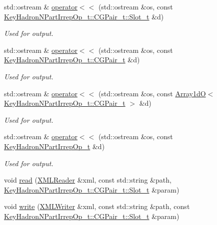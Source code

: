 \begin{DoxyCompactItemize}
std\+::ostream \& \mbox{\hyperlink{namespaceHadron_a61a4a4487102a9f9ee4c9409df53d3ed}{operator$<$$<$}} (std\+::ostream \&os, const \mbox{\hyperlink{structHadron_1_1KeyHadronNPartIrrepOp__t_1_1CGPair__t_1_1Slot__t}{Key\+Hadron\+N\+Part\+Irrep\+Op\+\_\+t\+::\+C\+G\+Pair\+\_\+t\+::\+Slot\+\_\+t}} \&d)
\begin{DoxyCompactList}\small\item\em Used for output. \end{DoxyCompactList}\item 
std\+::ostream \& \mbox{\hyperlink{namespaceHadron_a84411155d0fadad0466230e8cdd0d17c}{operator$<$$<$}} (std\+::ostream \&os, const \mbox{\hyperlink{structHadron_1_1KeyHadronNPartIrrepOp__t_1_1CGPair__t}{Key\+Hadron\+N\+Part\+Irrep\+Op\+\_\+t\+::\+C\+G\+Pair\+\_\+t}} \&d)
\begin{DoxyCompactList}\small\item\em Used for output. \end{DoxyCompactList}\item 
std\+::ostream \& \mbox{\hyperlink{namespaceHadron_a43b2528d47caea41d1eca554b9106b9c}{operator$<$$<$}} (std\+::ostream \&os, const \mbox{\hyperlink{classADAT_1_1Array1dO}{Array1dO}}$<$ \mbox{\hyperlink{structHadron_1_1KeyHadronNPartIrrepOp__t_1_1CGPair__t}{Key\+Hadron\+N\+Part\+Irrep\+Op\+\_\+t\+::\+C\+G\+Pair\+\_\+t}} $>$ \&d)
\begin{DoxyCompactList}\small\item\em Used for output. \end{DoxyCompactList}\item 
std\+::ostream \& \mbox{\hyperlink{namespaceHadron_a6d4dd7ed7a6efa27888f4ea9bdd20e51}{operator$<$$<$}} (std\+::ostream \&os, const \mbox{\hyperlink{structHadron_1_1KeyHadronNPartIrrepOp__t}{Key\+Hadron\+N\+Part\+Irrep\+Op\+\_\+t}} \&d)
\begin{DoxyCompactList}\small\item\em Used for output. \end{DoxyCompactList}\item 
void \mbox{\hyperlink{namespaceHadron_ab955c28b5566e0df089a26a611d4bf03}{read}} (\mbox{\hyperlink{classADATXML_1_1XMLReader}{X\+M\+L\+Reader}} \&xml, const std\+::string \&path, \mbox{\hyperlink{structHadron_1_1KeyHadronNPartIrrepOp__t_1_1CGPair__t_1_1Slot__t}{Key\+Hadron\+N\+Part\+Irrep\+Op\+\_\+t\+::\+C\+G\+Pair\+\_\+t\+::\+Slot\+\_\+t}} \&param)
\item 
void \mbox{\hyperlink{namespaceHadron_a005000ac92ae829ca325627dae07fb51}{write}} (\mbox{\hyperlink{classADATXML_1_1XMLWriter}{X\+M\+L\+Writer}} \&xml, const std\+::string \&path, const \mbox{\hyperlink{structHadron_1_1KeyHadronNPartIrrepOp__t_1_1CGPair__t_1_1Slot__t}{Key\+Hadron\+N\+Part\+Irrep\+Op\+\_\+t\+::\+C\+G\+Pair\+\_\+t\+::\+Slot\+\_\+t}} \&param)

\end{DoxyCompactItemize}
